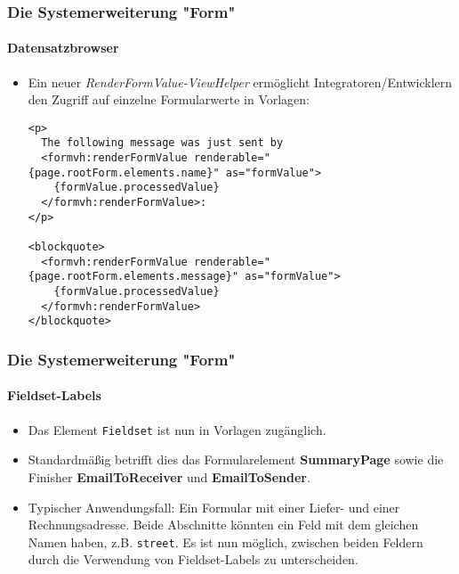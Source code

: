 
\begin{frame}[fragile]
	\frametitle{Die Systemerweiterung "Form"}
	\framesubtitle{Datensatzbrowser}

	\lstset{basicstyle=\tiny\ttfamily}

	\begin{itemize}
		\item Ein neuer \textit{RenderFormValue-ViewHelper} ermöglicht Integratoren/Entwicklern den Zugriff auf einzelne Formularwerte in Vorlagen:
\begin{lstlisting}
<p>
  The following message was just sent by
  <formvh:renderFormValue renderable="{page.rootForm.elements.name}" as="formValue">
    {formValue.processedValue}
  </formvh:renderFormValue>:
</p>

<blockquote>
  <formvh:renderFormValue renderable="{page.rootForm.elements.message}" as="formValue">
    {formValue.processedValue}
  </formvh:renderFormValue>
</blockquote>
\end{lstlisting}

	\end{itemize}

\end{frame}


\begin{frame}[fragile]
	\frametitle{Die Systemerweiterung "Form"}
	\framesubtitle{Fieldset-Labels}

	\begin{itemize}
		\item Das Element \texttt{Fieldset} ist nun in Vorlagen zugänglich.
		\item Standardmäßig betrifft dies das Formularelement \textbf{SummaryPage} sowie die Finisher \textbf{EmailToReceiver} und \textbf{EmailToSender}.
		\item Typischer Anwendungsfall:\newline
			\small
				Ein Formular mit einer Liefer- und einer Rechnungsadresse. Beide Abschnitte könnten ein Feld mit dem gleichen Namen haben, z.B. \texttt{street}.
				Es ist nun möglich, zwischen beiden Feldern durch die Verwendung von Fieldset-Labels zu unterscheiden.
			\normalsize

	\end{itemize}

\end{frame}

